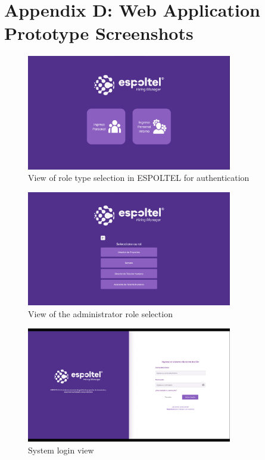 \documentclass{scrreprt}
\begin{document}
\section{Appendix D: Web Application Prototype Screenshots}

\begin{figure}[H]
	\centering \small
	\includegraphics[width=0.8\textwidth]{WebPrototype/wflow-1.jpeg}
	\caption{View of role type selection in ESPOLTEL for authentication}
\end{figure}

\begin{figure}[H]
	\centering \small
	\includegraphics[width=0.8\textwidth]{WebPrototype/wflow-2.jpeg}
	\caption{View of the administrator role selection}
\end{figure}

\begin{figure}[H]
	\centering \small
	\includegraphics[width=0.8\textwidth]{WebPrototype/wflow-3.jpeg}
	\caption{System login view}
\end{figure}
\end{document}
